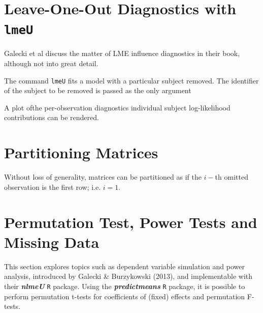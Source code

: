 \documentclass[12pt, a4paper]{report}
\theoremstyle{plain}
\theoremstyle{definition}
\theoremstyle{remark}
\begin{document}
%	
%
%









\section{Leave-One-Out Diagnostics with \texttt{lmeU}}
Galecki et al discuss the matter of LME influence diagnostics in their book, although not into great detail.


The command \texttt{lmeU} fits a model with a particular subject removed. The identifier of the subject to be removed is passed as the only argument

A plot ofthe per-observation diagnostics individual subject log-likelihood contributions can be rendered.


\section{Partitioning Matrices} %
Without loss of generality, matrices can be partitioned as if the $i-$th omitted observation is the first row; i.e. $i=1$.


\section{Permutation Test, Power Tests and Missing Data }

This section explores topics such as dependent variable simulation and power analysis, introduced by Galecki \& Burzykowski (2013), and implementable with their \textbf{\textit{nlmeU}} \texttt{R} package.
Using the \textbf{\textit{predictmeans}} \texttt{R} package, it is possible to perform permutation t-tests for coefficients of (fixed) effects and permutation F-tests.
\end{document}

